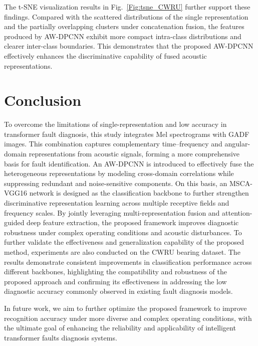 \documentclass[anonymous]{iopjournal}
\begin{document}
The t-SNE visualization results in Fig.~\ref{Fig:tsne_CWRU} further support these findings. Compared with the scattered distributions of the single representation and the partially overlapping clusters under concatenation fusion, the features produced by AW-DPCNN exhibit more compact intra-class distributions and clearer inter-class boundaries. This demonstrates that the proposed AW-DPCNN effectively enhances the discriminative capability of fused acoustic representations.

\section{Conclusion}
\label{section6}
To overcome the limitations of single-representation and low accuracy in transformer fault diagnosis, this study integrates Mel spectrograms with GADF images. This combination captures complementary time–frequency and angular-domain representations from acoustic signals, forming a more comprehensive basis for fault identification. An AW-DPCNN is introduced to effectively fuse the heterogeneous representations by modeling cross-domain correlations while suppressing redundant and noise-sensitive components. On this basis, an MSCA-VGG16 network is designed as the classification backbone to further strengthen discriminative representation learning across multiple receptive fields and frequency scales. By jointly leveraging multi-representation fusion and attention-guided deep feature extraction, the proposed framework improves diagnostic robustness under complex operating conditions and acoustic disturbances. To further validate the effectiveness and generalization capability of the proposed method, experiments are also conducted on the CWRU bearing dataset. The results demonstrate consistent improvements in classification performance across different backbones, highlighting the compatibility and robustness of the proposed approach and confirming its effectiveness in addressing the low diagnostic accuracy commonly observed in existing fault diagnosis models.

In future work, we aim to further optimize the proposed framework to improve recognition accuracy under more diverse and complex operating conditions, with the ultimate goal of enhancing the reliability and applicability of intelligent transformer faults diagnosis systems.




\end{document}
